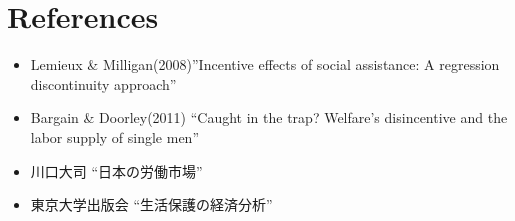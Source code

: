 \documentclass{jsarticle}
\begin{document}
\section{References}

 \begin{itemize}
 
 \item Lemieux \& Milligan(2008)''Incentive effects of social assistance: A regression
discontinuity approach''
 
 \item Bargain \& Doorley(2011) ``Caught in the trap? Welfare's disincentive and the labor supply of single men''
 
 \item 川口大司 ``日本の労働市場''
 
 \item 東京大学出版会 ``生活保護の経済分析''
 
 \end{itemize}
\end{document}
